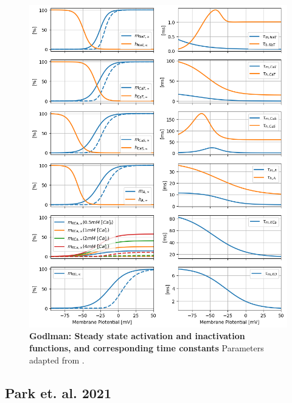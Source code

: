 \documentclass[../main.tex]{subfiles}
\begin{document}
\begin{figure}[!t]
    \centering
    \includegraphics[width=0.9\linewidth]{../img/model_kinetics/goldman.png}
    \caption[Godlman: Steady state activation and inactivation functions, and corresponding time constants]{
        \textbf{Godlman: Steady state activation and inactivation functions, and corresponding time constants} Parameters adapted from \parencite{franciRobustTunableBursting2018}.
    }
    \label{fig:kinetic_plots_goldman}
\end{figure}

\clearpage

\newpage
\subsection{Park et. al. 2021}
\end{document}
